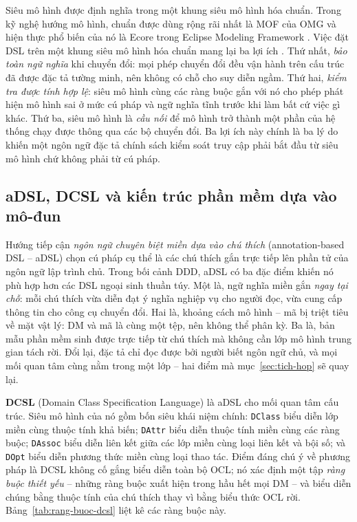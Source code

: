 Siêu mô hình được định nghĩa trong một khung siêu mô hình hóa chuẩn. Trong kỹ nghệ hướng mô hình, chuẩn được dùng rộng rãi nhất là MOF của OMG \cite{omg2019mof} và hiện thực phổ biến của nó là Ecore trong Eclipse Modeling Framework \cite{steinberg2008}. Việc đặt DSL trên một khung siêu mô hình hóa chuẩn mang lại ba lợi ích \cite{brambilla2017}. Thứ nhất, \emph{bảo toàn ngữ nghĩa} khi chuyển đổi: mọi phép chuyển đổi đều vận hành trên cấu trúc đã được đặc tả tường minh, nên không có chỗ cho suy diễn ngầm. Thứ hai, \emph{kiểm tra được tính hợp lệ}: siêu mô hình cùng các ràng buộc gắn với nó cho phép phát hiện mô hình sai ở mức cú pháp và ngữ nghĩa tĩnh trước khi làm bất cứ việc gì khác. Thứ ba, siêu mô hình là \emph{cầu nối} để mô hình trở thành một phần của hệ thống chạy được thông qua các bộ chuyển đổi. Ba lợi ích này chính là ba lý do khiến một ngôn ngữ đặc tả chính sách kiểm soát truy cập phải bắt đầu từ siêu mô hình chứ không phải từ cú pháp.

\subsection{aDSL, DCSL và kiến trúc phần mềm dựa vào mô-đun}
\label{subsec:adsl}

Hướng tiếp cận \emph{ngôn ngữ chuyên biệt miền dựa vào chú thích} (annotation-based DSL -- aDSL) \cite{le2018dcsl} chọn cú pháp cụ thể là các chú thích gắn trực tiếp lên phần tử của ngôn ngữ lập trình chủ. Trong bối cảnh DDD, aDSL có ba đặc điểm khiến nó phù hợp hơn các DSL ngoại sinh thuần túy. Một là, ngữ nghĩa miền gắn \emph{ngay tại chỗ}: mỗi chú thích vừa diễn đạt ý nghĩa nghiệp vụ cho người đọc, vừa cung cấp thông tin cho công cụ chuyển đổi. Hai là, khoảng cách mô hình -- mã bị triệt tiêu về mặt vật lý: DM và mã là cùng một tệp, nên không thể phân kỳ. Ba là, bản mẫu phần mềm sinh được trực tiếp từ chú thích mà không cần lớp mô hình trung gian tách rời. Đổi lại, đặc tả chỉ đọc được bởi người biết ngôn ngữ chủ, và mọi mối quan tâm cùng nằm trong một lớp -- hai điểm mà mục~\ref{sec:tich-hop} sẽ quay lại.

\textbf{DCSL} (Domain Class Specification Language) \cite{le2018dcsl,le2020} là aDSL cho mối quan tâm cấu trúc. Siêu mô hình của nó gồm bốn siêu khái niệm chính: \texttt{DClass} biểu diễn lớp miền cùng thuộc tính khả biến; \texttt{DAttr} biểu diễn thuộc tính miền cùng các ràng buộc; \texttt{DAssoc} biểu diễn liên kết giữa các lớp miền cùng loại liên kết và bội số; và \texttt{DOpt} biểu diễn phương thức miền cùng loại thao tác. Điểm đáng chú ý về phương pháp là DCSL không cố gắng biểu diễn toàn bộ OCL; nó xác định một tập \emph{ràng buộc thiết yếu} -- những ràng buộc xuất hiện trong hầu hết mọi DM -- và biểu diễn chúng bằng thuộc tính của chú thích thay vì bằng biểu thức OCL rời. Bảng~\ref{tab:rang-buoc-dcsl} liệt kê các ràng buộc này.

